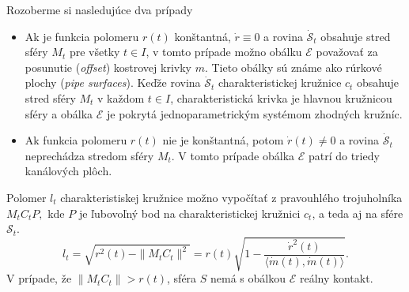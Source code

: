 Rozoberme si nasledujúce dva prípady
\begin{itemize}
\item Ak je funkcia polomeru $r(t)$ konštantná, $\dot{r} \equiv 0$ a rovina $\mathcal{\dot{S}}_t$ obsahuje stred sféry $M_t$ pre všetky $t \in I$, v tomto prípade možno obálku $\mathcal{E}$ považovať za posunutie (\textit{offset}) kostrovej krivky $m$. Tieto obálky sú známe ako rúrkové plochy (\textit{pipe surfaces}). Keďže rovina $\mathcal{\dot{S}}_t$ charakteristickej kružnice $c_t$ obsahuje stred sféry $M_t$ v každom $t \in I$, charakteristická krivka je hlavnou kružnicou sféry a obálka $\mathcal{E}$ je pokrytá jednoparametrickým systémom zhodných kružníc.
\item Ak funkcia polomeru $r(t)$ nie je konštantná, potom $\dot{r}(t) \neq 0$ a rovina $\mathcal{\dot{S}}_t$  neprechádza stredom sféry $M_t$. V tomto prípade obálka $\mathcal{E}$ patrí do triedy kanálových plôch.
\end{itemize}

Polomer $l_t$ charakteristiskej kružnice  možno vypočítať z pravouhlého trojuholníka $M_tC_tP,$ kde $P$ je ľubovoľný bod na charakteristickej kružnici $c_t$, a teda aj na sfére $\mathcal{S}_t.$
$$ l_t = \sqrt{r^2(t) - \|M_tC_t\|^2} = r(t) \sqrt{ 1 - \frac{\dot{r}^2(t)}{\langle \dot{m}(t), \dot{m}(t) \rangle}}. $$
V prípade, že $ \|M_tC_t\| > r(t)$, sféra $S$ nemá s obálkou $\mathcal{E}$ reálny kontakt. 

